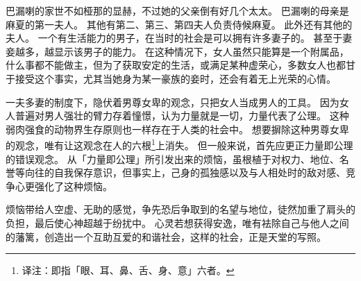 \documentclass[twoside,openany]{book}
\begin{document}
巴漏喇的家世不如桠那的显赫，不过她的父亲倒有好几个太太。
巴漏喇的母亲是麻夏的第一夫人。
其他有第二、第三、第四夫人负责侍候麻夏。
此外还有其他的夫人。
一个有生活能力的男子，在当时的社会是可以拥有许多妻子的。
甚至于妻妾越多，越显示该男子的能力。
在这种情况下，女人虽然只能算是一个附属品，什么事都不能做主，但为了获取安定的生活，或满足某种虚荣心，多数女人也都甘于接受这个事实，尤其当她身为某一豪族的妾时，还会有着无上光荣的心情。

一夫多妻的制度下，隐伏着男尊女卑的观念，只把女人当成男人的工具。
因为女人普遍对男人强壮的臂力存着憧憬，认为力量就是一切，力量代表了公理。
这种弱肉强食的动物界生存原则也一样存在于人类的社会中。
%
%
%
%
%
想要摒除这种男尊女卑的观念，唯有让这观念在人的六根\footnote{译注：即指「眼、耳、鼻、舌、身、意」六者。}上消失。
但一般来说，首先应更正力量即公理的错误观念。
从「力量即公理」所引发出来的烦恼，虽根植于对权力、地位、名誉等向往的自我保存意识，但事实上，己身的孤独感以及与人相处时的敌对感、竞争心更强化了这种烦恼。

烦恼带给人空虚、无助的感觉，争先恐后争取到的名望与地位，徒然加重了肩头的负担，最后使心神超越于纷扰中。
心灵若想获得安逸，唯有袪除自己与他人之间的藩篱，创造出一个互助互爱的和谐社会，这样的社会，正是天堂的写照。
%
%
%
%
%
%
%
%
%
%
%
\end{document}
